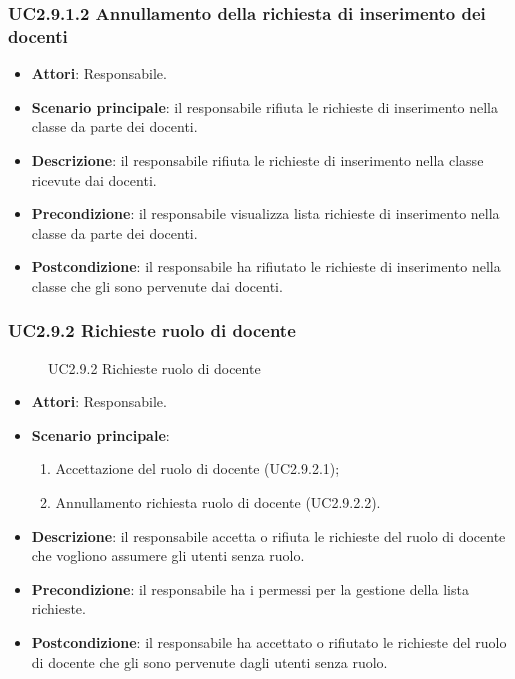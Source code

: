 \subsubsection{UC2.9.1.2 Annullamento della richiesta di inserimento dei docenti}
\begin{itemize}
\item \textbf{Attori}: Responsabile.
\item \textbf{Scenario principale}: il responsabile rifiuta le richieste di inserimento nella classe da parte dei docenti.
\item \textbf{Descrizione}: il responsabile rifiuta le richieste di inserimento nella classe ricevute dai docenti.
\item \textbf{Precondizione}: il responsabile visualizza lista richieste di inserimento nella classe da parte dei docenti.
\item \textbf{Postcondizione}: il responsabile ha rifiutato le richieste di inserimento nella classe che gli sono pervenute dai docenti.
\end{itemize}
\subsubsection{UC2.9.2 Richieste ruolo di docente}
\begin{figure}[H]
\centering
\noindent{}
\caption{UC2.9.2 Richieste ruolo di docente}
\end{figure}
\begin{itemize}
\item \textbf{Attori}: Responsabile.
\item \textbf{Scenario principale}:
\begin{enumerate}
\item Accettazione del ruolo di docente (UC2.9.2.1);
\item Annullamento richiesta ruolo di docente (UC2.9.2.2).
\end{enumerate}
\item \textbf{Descrizione}: il responsabile accetta o rifiuta le richieste del ruolo di docente che vogliono assumere gli utenti senza ruolo.
\item \textbf{Precondizione}: il responsabile ha i permessi per la gestione della lista richieste.
\item \textbf{Postcondizione}: il responsabile ha accettato o rifiutato le richieste del ruolo di docente che gli sono pervenute dagli utenti senza ruolo.
\end{itemize}
